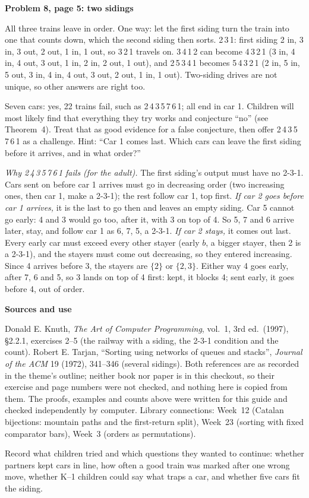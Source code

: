 \documentclass[11pt]{article}
\newcommand{\head}[1]{\par\needspace{5\baselineskip}\textbf{\large #1}\par\nopagebreak}
\newcommand{\sub}[1]{\par\needspace{3\baselineskip}\textbf{#1}\par\nopagebreak}
\newcommand{\tr}[1]{\mbox{#1}}
\begin{document}
\sub{Problem 8, page 5: two sidings}
All three trains leave in order. One way: let the first siding turn the train into one that counts down, which the second siding then sorts. \tr{2\,3\,1}: first siding 2 in, 3 in, 3 out, 2 out, 1 in, 1 out, so \tr{3\,2\,1} travels on. \tr{3\,4\,1\,2} can become \tr{4\,3\,2\,1} (3 in, 4 in, 4 out, 3 out, 1 in, 2 in, 2 out, 1 out), and \tr{2\,5\,3\,4\,1} becomes \tr{5\,4\,3\,2\,1} (2 in, 5 in, 5 out, 3 in, 4 in, 4 out, 3 out, 2 out, 1 in, 1 out). Two-siding drives are not unique, so other answers are right too.

Seven cars: yes, 22 trains fail, such as \tr{2\,4\,3\,5\,7\,6\,1}; all end in car 1. Children will most likely find that everything they try works and conjecture ``no'' (see Theorem~4). Treat that as good evidence for a false conjecture, then offer \tr{2\,4\,3\,5\,7\,6\,1} as a challenge. Hint: ``Car 1 comes last. Which cars can leave the first siding before it arrives, and in what order?''

\emph{Why \tr{2\,4\,3\,5\,7\,6\,1} fails (for the adult).} The first siding's output must have no 2-3-1. Cars sent on before car 1 arrives must go in decreasing order (two increasing ones, then car 1, make a 2-3-1); the rest follow car 1, top first. \emph{If car 2 goes before car 1 arrives,} it is the last to go then and leaves an empty siding. Car 5 cannot go early: 4 and 3 would go too, after it, with 3 on top of 4. So 5, 7 and 6 arrive later, stay, and follow car 1 as 6, 7, 5, a 2-3-1. \emph{If car 2 stays,} it comes out last. Every early car must exceed every other stayer (early $b$, a bigger stayer, then 2 is a 2-3-1), and the stayers must come out decreasing, so they entered increasing. Since 4 arrives before 3, the stayers are $\{2\}$ or $\{2,3\}$. Either way 4 goes early, after 7, 6 and 5, so 3 lands on top of 4 first: kept, it blocks 4; sent early, it goes before 4, out of order.

\head{Sources and use}
Donald E. Knuth, \emph{The Art of Computer Programming}, vol.~1, 3rd ed.\ (1997), \S2.2.1, exercises 2--5 (the railway with a siding, the 2-3-1 condition and the count). Robert E. Tarjan, ``Sorting using networks of queues and stacks'', \emph{Journal of the ACM} 19 (1972), 341--346 (several sidings). Both references are as recorded in the theme's outline; neither book nor paper is in this checkout, so their exercise and page numbers were not checked, and nothing here is copied from them. The proofs, examples and counts above were written for this guide and checked independently by computer. Library connections: Week~12 (Catalan bijections: mountain paths and the first-return split), Week~23 (sorting with fixed comparator bars), Week~3 (orders as permutations).

Record what children tried and which questions they wanted to continue: whether partners kept cars in line, how often a good train was marked \no{} after one wrong move, whether K--1 children could say what traps a car, and whether five cars fit the siding.
\end{document}
